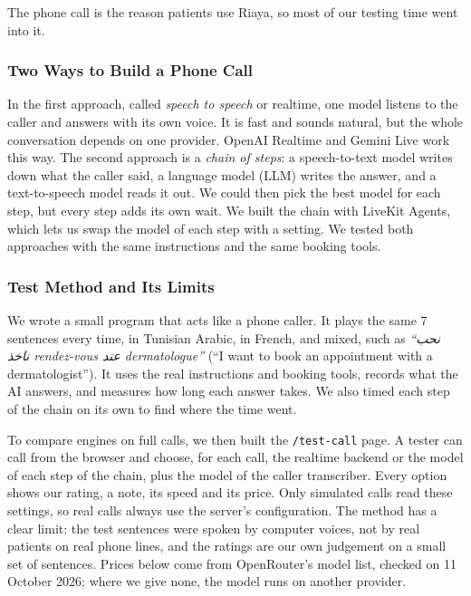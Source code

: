 The phone call is the reason patients use Riaya, so most of our testing time went into it.

\subsubsection{Two Ways to Build a Phone Call}

In the first approach, called \emph{speech to speech} or realtime, one model listens to the caller and answers with its own voice. It is fast and sounds natural, but the whole conversation depends on one provider. OpenAI Realtime and Gemini Live work this way. The second approach is a \emph{chain of steps}: a speech-to-text model writes down what the caller said, a language model (LLM) writes the answer, and a text-to-speech model reads it out. We could then pick the best model for each step, but every step adds its own wait. We built the chain with LiveKit Agents, which lets us swap the model of each step with a setting. We tested both approaches with the same instructions and the same booking tools.

\subsubsection{Test Method and Its Limits}

We wrote a small program that acts like a phone caller. It plays the same 7 sentences every time, in Tunisian Arabic, in French, and mixed, such as \textit{``\foreignlanguage{arabic}{نحب ناخذ} rendez-vous \foreignlanguage{arabic}{عند} dermatologue''} (``I want to book an appointment with a dermatologist''). It uses the real instructions and booking tools, records what the AI answers, and measures how long each answer takes. We also timed each step of the chain on its own to find where the time went.

To compare engines on full calls, we then built the \texttt{/test-call} page. A tester can call from the browser and choose, for each call, the realtime backend or the model of each step of the chain, plus the model of the caller transcriber. Every option shows our rating, a note, its speed and its price. Only simulated calls read these settings, so real calls always use the server's configuration. The method has a clear limit: the test sentences were spoken by computer voices, not by real patients on real phone lines, and the ratings are our own judgement on a small set of sentences. Prices below come from OpenRouter's model list, checked on 11 October 2026; where we give none, the model runs on another provider.

